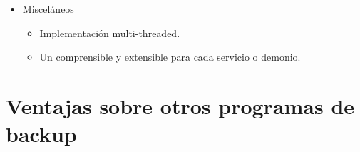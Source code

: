 \begin{itemize}
\item Misceláneos
   \begin{itemize}
   \item Implementación multi-threaded. 
   \item Un  
       comprensible y extensible
      para cada servicio o demonio.  
   \end{itemize}
\end{itemize}

\section{Ventajas sobre otros programas de backup}

